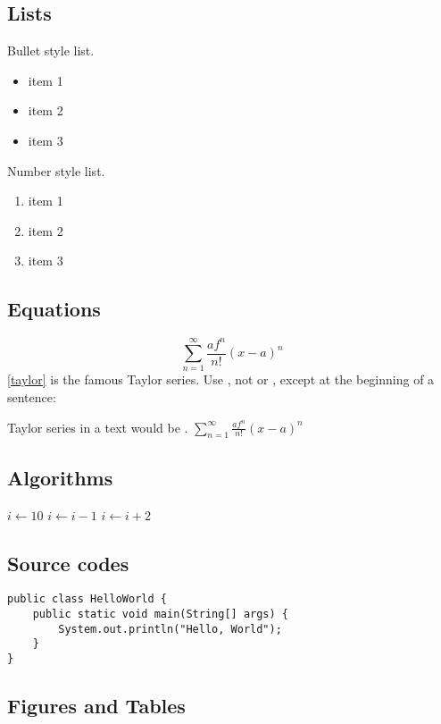 \documentclass[conference]{IEEEtran}
\begin{document}
\subsection{Lists}
Bullet style list.
\begin{itemize}
\item item 1
\item item 2
\item item 3
\end{itemize}
Number style list.
\begin{enumerate}
\item item 1
\item item 2
\item item 3
\end{enumerate}


\subsection{Equations}
\begin{equation}
\sum_{n=1}^{\infty} \frac{af^n}{n!}  (x - a)^n
\label{taylor}
\end{equation}
\eqref{taylor} is the famous Taylor series. 
Use , not 
or , except at the beginning of a sentence: 
\par Taylor series in a text would be .
\begin{math}  \sum_{n=1}^{\infty} \frac{af^n}{n!}  (x - a)^n
\end{math}
\subsection{Algorithms}
\begin{algorithmic}
\STATE $i\gets 10$
        \STATE $i\gets i-1$
\ELSE
                \STATE $i\gets i+2$
        \ENDIF
\ENDIF 
\end{algorithmic}

\subsection{Source codes}
\begin{lstlisting}
public class HelloWorld {
    public static void main(String[] args) {
        System.out.println("Hello, World");
    }
}
\end{lstlisting}

\subsection{Figures and Tables}
\end{document}

